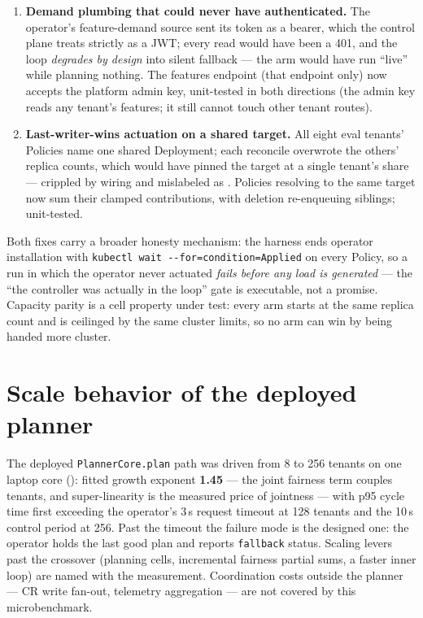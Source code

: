 \begin{enumerate}
  \item \textbf{Demand plumbing that could never have authenticated.} The
        operator's feature-demand source sent its token as a bearer, which
        the control plane treats strictly as a JWT; every read would have
        been a 401, and the \jcac{} loop \emph{degrades by design} into
        silent fallback --- the arm would have run ``live'' while planning
        nothing. The features endpoint (that endpoint only) now accepts the
        platform admin key, unit-tested in both directions (the admin key
        reads any tenant's features; it still cannot touch other tenant
        routes).
  \item \textbf{Last-writer-wins actuation on a shared target.} All eight
        eval tenants' Policies name one shared Deployment; each reconcile
        overwrote the others' replica counts, which would have pinned the
        target at a single tenant's share --- \jcac{} crippled by wiring and
        mislabeled as \jcac{}. Policies resolving to the same target now sum
        their clamped contributions, with deletion re-enqueuing siblings;
        unit-tested.
\end{enumerate}

Both fixes carry a broader honesty mechanism: the harness ends operator
installation with \texttt{kubectl wait -{}-for=condition=Applied} on every
Policy, so a run in which the operator never actuated \emph{fails before
any load is generated} --- the ``the controller was actually in the loop''
gate is executable, not a promise. Capacity parity is a cell property under
test: every arm starts at the same replica count and is ceilinged by the
same cluster limits, so no arm can win by being handed more cluster.

\section{Scale behavior of the deployed planner}
\label{sec:impl-scaling}

The deployed \texttt{PlannerCore.plan} path was driven from 8 to 256 tenants
on one laptop core (): fitted
growth exponent \textbf{1.45} --- the joint fairness term couples tenants,
and super-linearity is the measured price of jointness --- with p95 cycle
time first exceeding the operator's 3\,s request timeout at 128 tenants and
the 10\,s control period at 256. Past the timeout the failure mode is the
designed one: the operator holds the last good plan and reports
\texttt{fallback} status. Scaling levers past the crossover (planning cells,
incremental fairness partial sums, a faster inner loop) are named with the
measurement. Coordination costs outside the planner --- CR write fan-out,
telemetry aggregation --- are not covered by this microbenchmark.
